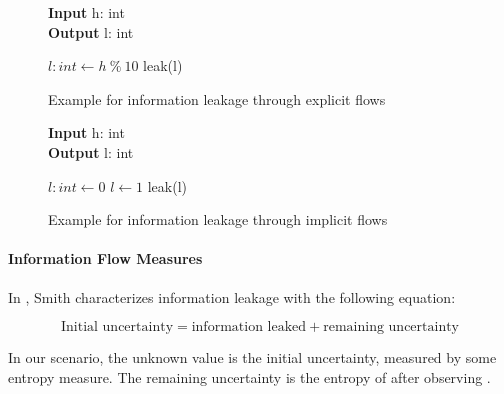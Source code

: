 \begin{figure}
    \centering
    \begin{minipage}{.7\linewidth}
        \begin{algorithm}[H]
            \hspace*{\algorithmicindent} \textbf{Input} h: int \\
            \hspace*{\algorithmicindent} \textbf{Output} l: int
            \hspace*{1em}
            \begin{algorithmic}[1]
                \State $l: int \leftarrow h \: \% \: 10$
                \State leak(l)
            \end{algorithmic} 
        \end{algorithm}
\end{minipage}
\caption{Example for information leakage through explicit flows}
\label{fig:exEx}
\end{figure}

\begin{figure}
    \centering
    \begin{minipage}{.7\linewidth}
        \begin{algorithm}[H]
            \hspace*{\algorithmicindent} \textbf{Input} h: int \\
            \hspace*{\algorithmicindent} \textbf{Output} l: int
            \hspace*{1em}
            \begin{algorithmic}[1]
                \State $l: int \leftarrow 0$
                \State $l \leftarrow 1$
                \EndIf
                \State leak(l)
            \end{algorithmic} 
        \end{algorithm}
\end{minipage}
\caption{Example for information leakage through implicit flows}
\label{fig:ifEx}
\end{figure}

\paragraph{Information Flow Measures}

In \cite{smith09}, Smith characterizes information leakage with the following equation:
\begin{center}
    \begin{equation}
        \text{Initial uncertainty} = \text{information leaked} + \text{remaining uncertainty}
    \end{equation}\label{eq:measure}
    
\end{center}
In our scenario, the unknown value \In is the initial uncertainty, measured by some entropy measure. The remaining uncertainty is the entropy of \In after observing \Out.


